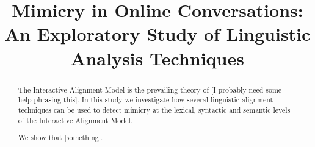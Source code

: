 \documentclass[conference]{IEEEtran}
\begin{document}
\title{Mimicry in Online Conversations: An Exploratory Study of Linguistic Analysis Techniques}


\author{
}


% 








\maketitle

\begin{abstract}
The Interactive Alignment Model is the prevailing theory of
[I probably need some help phrasing this].
In this study we investigate how several linguistic alignment techniques can be used
to detect mimicry at the lexical, syntactic and semantic levels of the
Interactive Alignment Model.

We show that [something].
\end{abstract}
\end{document}
